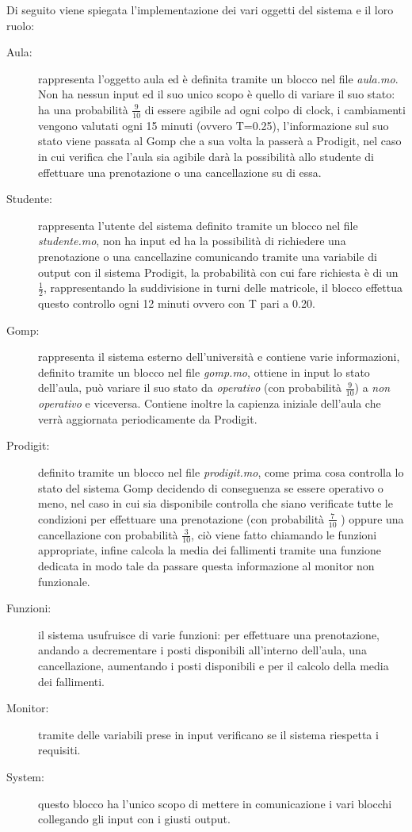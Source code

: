 \par Di seguito viene spiegata l’implementazione dei vari oggetti del sistema e il loro ruolo:
\begin{description}
\item [Aula:] rappresenta l’oggetto aula ed è definita tramite un blocco nel file \textit{aula.mo}. Non ha nessun input ed il suo unico scopo è quello di variare il suo stato: ha una probabilità $\frac{9}{10}$ di essere agibile ad ogni colpo di clock, i cambiamenti vengono valutati ogni 15 minuti (ovvero T=0.25), l’informazione sul suo stato viene passata al Gomp che a sua volta la passerà a Prodigit, nel caso in cui verifica che l’aula sia agibile darà la possibilità allo studente di effettuare una prenotazione o una cancellazione su di essa.
\item [Studente:] rappresenta l’utente del sistema definito tramite un blocco nel file \textit{studente.mo}, non ha input ed ha la possibilità di richiedere una prenotazione o una cancellazine comunicando tramite una variabile di output con il sistema Prodigit, la probabilità con cui fare richiesta è di un $\frac{1}{2}$, rappresentando la suddivisione in turni delle matricole, il blocco effettua questo controllo ogni 12 minuti ovvero con T pari a 0.20.
\item [Gomp:] rappresenta il sistema esterno dell’università e contiene varie informazioni, definito tramite un blocco nel file \textit{gomp.mo}, ottiene in input lo stato dell’aula, può variare il suo stato da \textit{operativo} (con probabilità $\frac{9}{10}$) a \textit{non operativo} e viceversa. Contiene inoltre  la capienza iniziale dell’aula che verrà aggiornata periodicamente da Prodigit.
\item [Prodigit:] definito tramite un blocco nel file \textit{prodigit.mo}, come prima cosa controlla lo stato del sistema Gomp decidendo di conseguenza se essere operativo o meno, nel caso in cui sia disponibile controlla che siano verificate tutte le condizioni per effettuare una prenotazione (con probabilità $\frac{7}{10}$ ) oppure una cancellazione con probabilità  $\frac{3}{10}$, ciò viene fatto chiamando le funzioni appropriate, infine calcola la media dei fallimenti tramite una funzione dedicata in modo tale da passare questa informazione al monitor non funzionale.

\item [Funzioni:] il sistema usufruisce di varie funzioni: per effettuare una prenotazione, andando a decrementare i posti disponibili all’interno dell’aula, una cancellazione, aumentando i posti disponibili e per il calcolo della media dei fallimenti.

\item [Monitor:] tramite delle variabili prese in input verificano se il sistema riespetta i requisiti.

\item [System:] questo blocco ha l’unico scopo di mettere in comunicazione i vari blocchi collegando gli input con i giusti output.
\end{description}